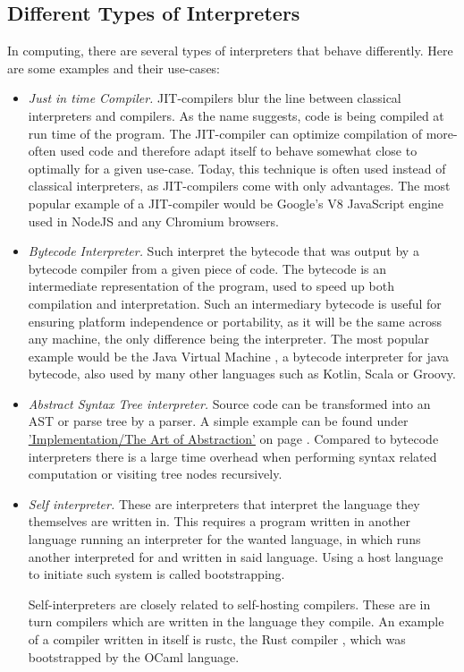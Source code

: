 \documentclass[12pt,a4paper]{article}
\newcommand{\cte}[1] {
    \cite{#1}
}
\begin{document}
\subsection{Different Types of Interpreters}
In computing, there are several types of interpreters that behave differently.
Here are some examples and their use-cases:
\begin{itemize}
    \item \emph{Just in time Compiler.} JIT-compilers blur the line between
        classical interpreters and compilers. As the name suggests, code is
        being compiled at run time of the program. The JIT-compiler can optimize
        compilation of more-often used code and therefore adapt itself to
        behave somewhat close to optimally for a given use-case. Today, this 
        technique is often used instead of classical interpreters, as
        JIT-compilers come with only advantages. The most popular example of
        a JIT-compiler would be Google's V8\cte{V8} JavaScript engine used
        in NodeJS and any Chromium browsers.
    \item \emph{Bytecode Interpreter.} Such interpret the bytecode that was
        output by a bytecode compiler from a given piece of code. The bytecode
        is an intermediate representation of the program, used to speed up
        both compilation and interpretation. Such an intermediary bytecode is
        useful for ensuring platform independence or portability, as it will be
        the same across any machine, the only difference being the interpreter.
        The most popular example would be the Java Virtual Machine\cte{jvm},
        a bytecode interpreter for java bytecode, also used by many other languages
        such as Kotlin, Scala or Groovy.
    \item \emph{Abstract Syntax Tree interpreter.} Source code can be
        transformed into an AST or parse tree by a parser. A simple example
        can be found under 
        \hyperref[simple interpreter]{'Implementation/The Art of Abstraction'}
        on page \pageref{simple interpreter}. Compared to bytecode interpreters
        there is a large time overhead when performing syntax related computation
        or visiting tree nodes recursively.
    \item \emph{Self interpreter.} These are interpreters that interpret the
        language they themselves are written in. This requires a program
        written in another language running an interpreter for the wanted
        language, in which runs another interpreted for and written in said
        language. Using a host language to initiate such system is called
        bootstrapping.

        Self-interpreters are closely related to self-hosting compilers. These
        are in turn compilers which are written in the language they compile.
        An example of a compiler written in itself is rustc, the Rust
        compiler\cte{rustc}, which was bootstrapped by the OCaml language.
\end{itemize}
\end{document}
